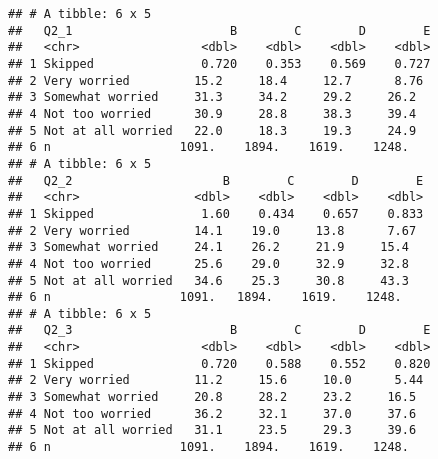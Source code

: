 \documentclass[
]{article}
\begin{document}
\begin{verbatim}
## # A tibble: 6 x 5
##   Q2_1                      B        C        D        E
##   <chr>                 <dbl>    <dbl>    <dbl>    <dbl>
## 1 Skipped               0.720    0.353    0.569    0.727
## 2 Very worried         15.2     18.4     12.7      8.76 
## 3 Somewhat worried     31.3     34.2     29.2     26.2  
## 4 Not too worried      30.9     28.8     38.3     39.4  
## 5 Not at all worried   22.0     18.3     19.3     24.9  
## 6 n                  1091.    1894.    1619.    1248.   
## # A tibble: 6 x 5
##   Q2_2                     B        C        D        E
##   <chr>                <dbl>    <dbl>    <dbl>    <dbl>
## 1 Skipped               1.60    0.434    0.657    0.833
## 2 Very worried         14.1    19.0     13.8      7.67 
## 3 Somewhat worried     24.1    26.2     21.9     15.4  
## 4 Not too worried      25.6    29.0     32.9     32.8  
## 5 Not at all worried   34.6    25.3     30.8     43.3  
## 6 n                  1091.   1894.    1619.    1248.   
## # A tibble: 6 x 5
##   Q2_3                      B        C        D        E
##   <chr>                 <dbl>    <dbl>    <dbl>    <dbl>
## 1 Skipped               0.720    0.588    0.552    0.820
## 2 Very worried         11.2     15.6     10.0      5.44 
## 3 Somewhat worried     20.8     28.2     23.2     16.5  
## 4 Not too worried      36.2     32.1     37.0     37.6  
## 5 Not at all worried   31.1     23.5     29.3     39.6  
## 6 n                  1091.    1894.    1619.    1248.
\end{verbatim}
\end{document}
